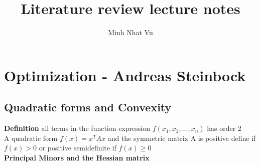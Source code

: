 \documentclass[a4paper]{article}
\title{Literature review lecture notes}
\author{Minh Nhat Vu}
\begin{document}
\maketitle
\section{Optimization - Andreas Steinbock}
\subsection{Quadratic forms and Convexity}
\textbf{Definition} all terms in the function expression $f(x_1,x_2,...,x_n)$ has order 2 \\
A quadratic form $f(x) = x^T A x$ and the symmetric matrix A is positive define if $f(x) > 0$ or positive semidefinite if   $f(x) \geq 0$ \\
\textbf{Principal Minors and the Hessian matrix}



\end{document}
